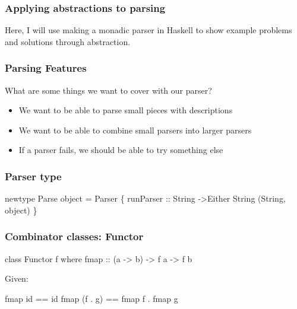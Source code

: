 \documentclass{beamer}
\begin{document}
\begin{frame}
\frametitle{Applying abstractions to parsing}
  Here, I will use making a monadic parser in Haskell 
  to show example problems and solutions through abstraction.
\end{frame}


\begin{frame}
\frametitle{Parsing Features}
  What are some things we want to cover with our parser?
  \begin{itemize}
    \item We want to be able to parse small pieces with descriptions
    \item We want to be able to combine small parsers into larger parsers
    \item If a parser fails, we should be able to try something else
  \end{itemize}
\end{frame}


\begin{frame}
\frametitle{Parser type}
  newtype Parse object = Parser \{ runParser :: String ->Either String (String, object) \}
\end{frame}




\begin{frame}
\frametitle{Combinator classes: Functor}
class Functor f where
  fmap :: (a -> b) -> f a -> f b

  Given:

 fmap id == id
 fmap (f . g) == fmap f . fmap g
\end{frame}


%
%
\end{document}
